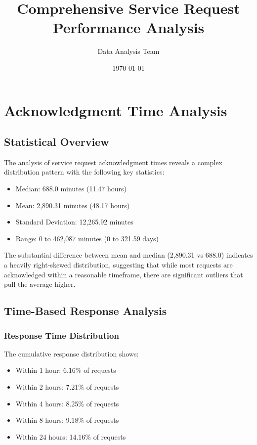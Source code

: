 \documentclass[12pt]{report}
\title{Comprehensive Service Request Performance Analysis}
\author{Data Analysis Team}
\date{\today}
\begin{document}
\maketitle
\tableofcontents

\chapter{Acknowledgment Time Analysis}

\section{Statistical Overview}
The analysis of service request acknowledgment times reveals a complex distribution pattern with the following key statistics:
\begin{itemize}
    \item Median: 688.0 minutes (11.47 hours)
    \item Mean: 2,890.31 minutes (48.17 hours)
    \item Standard Deviation: 12,265.92 minutes
    \item Range: 0 to 462,087 minutes (0 to 321.59 days)
\end{itemize}

The substantial difference between mean and median (2,890.31 vs 688.0) indicates a heavily right-skewed distribution, suggesting that while most requests are acknowledged within a reasonable timeframe, there are significant outliers that pull the average higher.

\section{Time-Based Response Analysis}
\subsection{Response Time Distribution}
The cumulative response distribution shows:
\begin{itemize}
    \item Within 1 hour: 6.16\% of requests
    \item Within 2 hours: 7.21\% of requests
    \item Within 4 hours: 8.25\% of requests
    \item Within 8 hours: 9.18\% of requests
    \item Within 24 hours: 14.16\% of requests
\end{itemize}
\end{document}
